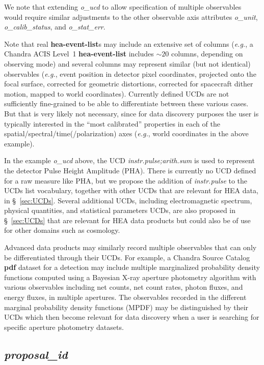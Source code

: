 \documentclass[11pt,a4paper]{ivoa}
\begin{document}
We note that extending {\em o\_ucd\/} to allow specification of multiple observables would require similar adjustments to the other observable axis attributes {\em o\_unit\/}, {\em o\_calib\_status\/}, and {\em o\_stat\_err\/}.

Note that real {\bf hea-event-list}s may include an extensive set of columns ({\em e.g.\/}, a Chandra ACIS Level~1 {\bf hea-event-list} includes $\sim\!20$ columns, depending on observing mode) and several columns may represent similar (but not identical) observables ({\em e.g.\/}, event position in detector pixel coordinates, projected onto the focal surface, corrected for geometric distortions, corrected for spacecraft dither motion, mapped to world coordinates).  Currently defined UCDs are not sufficiently fine-grained to be able to differentiate between these various cases. But that is very likely not necessary, since for data discovery purposes the user is typically interested in the ``most calibrated'' properties in each of the spatial/spectral/time(/polarization) axes ({\em e.g.\/}, world coordinates in the above example).

In the example {\em o\_ucd\/} above, the UCD {\em instr.pulse;arith.sum\/} is used to represent the detector Pulse Height Amplitude (PHA)\null. There is currently no UCD defined for a raw measure like PHA, but we propose the addition of {\em instr.pulse\/} to the UCDs list vocabulary, together with other UCDs that are relevant for \gls{HEA} data, in \S~\ref{sec:UCDs}.  Several additional UCDs, including electromagnetic spectrum, physical quantities, and statistical parameters UCDs, are also proposed in \S~\ref{sec:UCDs} that are relevant for \gls{HEA} data products but could also be of use for other domains such as cosmology.

Advanced data products may similarly record multiple observables that can only be differentiated through their UCDs. For example, a Chandra Source Catalog {\bf pdf} dataset for a detection may include multiple marginalized probability density functions computed using a Bayesian X-ray aperture photometry algorithm with various observables including net counts, net count rates, photon fluxes, and energy fluxes, in multiple apertures.  The observables recorded in the different marginal probability density functions (MPDF) may be distinguished by their UCDs which then become relevant for data discovery when a user is searching for specific aperture photometry datasets.


\subsection{{\em proposal\_id}}
\end{document}
